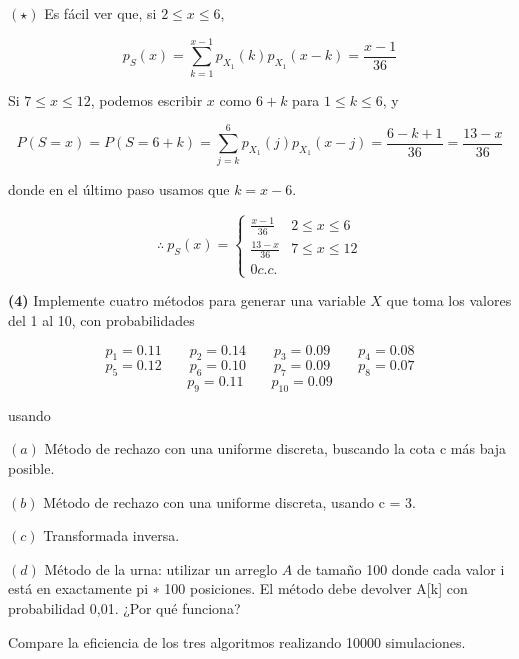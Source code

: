\documentclass[a4paper, 12pt]{article}
\begin{document}
\pagebreak 

\begin{helpframe}
$(\star)$ Es fácil ver que, si $2 \leq x \leq 6$,

\begin{equation*}
  p_S(x) = \sum_{k=1}^{x-1} p_{X_1}(k)p_{X_1}(x - k) = \frac{x-1}{36}
\end{equation*}

Si $7 \leq x \leq 12$, podemos escribir $x$ como $6 + k$ para $1 \leq k \leq 6$,
y

\begin{equation*}
  P(S = x) = P(S = 6 + k) = \sum_{j=k}^{6} p_{X_1}(j)p_{X_1}(x - j) = \frac{6 -
  k + 1}{36} = \frac{13 - x}{36}
\end{equation*}

donde en el último paso usamos que $k = x - 6$. 

\begin{equation*}
  \therefore ~ p_S(x) = \begin{cases}
    \frac{x-1}{36} &2 \leq x \leq 6 \\ 
    \frac{13-x}{36} &7 \leq x \leq 12 \\ 
    0 c.c.
  \end{cases}
\end{equation*}
\end{helpframe}



\pagebreak 

\begin{myframe}
\textbf{(4)} Implemente cuatro métodos para generar una variable $X$ que toma los
valores del 1 al 10, con probabilidades

\begin{equation*}
  p_1 = 0.11 \qquad p_2 = 0.14 \qquad p_3 = 0.09 \qquad p_4 = 0.08
\end{equation*}
\begin{equation*}
  p_5 = 0.12 \qquad p_6 = 0.10 \qquad p_7 = 0.09 \qquad p_8 = 0.07
\end{equation*}
\begin{equation*}
  p_9 = 0.11 \qquad p_{10} = 0.09 
\end{equation*}

usando

$(a)$ Método de rechazo con una uniforme discreta, buscando la cota c más baja
posible. 

$(b)$ Método de rechazo con una uniforme discreta, usando c = 3. 

$(c)$ Transformada inversa. 

$(d)$ Método de la urna: utilizar un arreglo $A$ de tamaño 100
donde cada valor i está en exactamente pi ∗ 100 posiciones. El método debe
devolver A[k] con probabilidad 0,01. ¿Por qué funciona?

Compare la eficiencia de los tres algoritmos realizando 10000 simulaciones.
\end{myframe}
\end{document}
